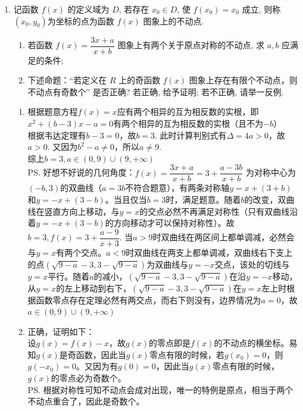 \begin{enumerate}
\begin{vspace_}
   \vsp[5] 
\end{vspace_}


\item 记函数 $f(x)$ 的定义域为 $D$, 若存在 $x_0 \in D$, 使 $f\left(x_0\right)=x_0$ 成立, 则称 $\left(x_0, y_0\right)$为坐标的点为函数 $f(x)$ 图象上的不动点.
\begin{enumerate}
    \item 若函数 $f(x)=\dfrac{3x+a}{x+b}$ 图象上有两个关于原点对称的不动点, 求 $a, b$ 应满足的条件;
    \item 下述命题：“若定义在 $R$ 上的奇函数 $f(x)$ 图象上存在有限个不动点，则不动点有奇数个” 是否正确? 若正确, 给予证明; 若不正确, 请举一反例.
\end{enumerate}
\begin{jieda}
    \begin{enumerate}
        \item 
        根据题意方程$f(x) = x$应有两个相异的互为相反数的实根，即$x^2 + (b-3)x - a = 0$有两个相异的互为相反数的实根（且不为$-b$）\\
        根据韦达定理有$b-3 = 0$，故$b = 3$. 此时计算判别式有$\Delta = 4a > 0$，故$a > 0$. 又因为$b^2 - a \neq 0$，所以$a \neq 9$.\\
        综上$b = 3, a \in (0, 9) \cup (9, +\infty)$
        \\
        \ps 好想不好说的几何角度：$f(x)=\dfrac{3x+a}{x+b} = 3 + \dfrac{a - 3b}{x+b}$ 为对称中心为$(-b, 3)$的双曲线（$a = 3b$不符合题意），有两条对称轴$y = x + (3+b)$和$y = -x + (3-b)$。当且仅当$b = 3$时，满足题意。随着$b$的改变，双曲线在竖直方向上移动，与$y = x$的交点必然不再满足对称性（只有双曲线沿着$y = -x + (3-b)$的方向移动才可以保持对称性）。故$b = 3, f(x) = 3 + \dfrac{a-9}{x+3}$. 当$a > 9$时双曲线在两区间上都单调减，必然会与$y = x$有两个交点。$a < 9$时双曲线在两支上都单调减，双曲线右下支上的点$(\sqrt{9-a}-3, 3-\sqrt{9-a})$为双曲线与$y = -x$交点，该处的切线与$y = x$平行。随着$a$的减小，$(\sqrt{9-a}-3, 3-\sqrt{9-a})$在沿$y = -x$移动，从$y = x$的左上移动到右下，$(\sqrt{9-a}-3, 3-\sqrt{9-a})$在$y = x$左上时根据函数零点存在定理必然有两交点，而右下则没有，边界情况为$a = 0$，故$a \in (0, 9) \cup (9, +\infty)$
        \item 正确，证明如下：\\
        设$g(x) = f(x) - x$，故$g(x)$的零点即是$f(x)$的不动点的横坐标。易知$g(x)$是奇函数，因此当$g(x)$零点有限的时候，若$g(x_0) = 0$，则$g(-x_0) = 0$。又因为有$g(0) = 0$，因此当$g(x)$零点有限的时候，$g(x)$的零点必为奇数个。 \\
        \ps 根据对称性可知不动点会成对出现，唯一的特例是原点，相当于两个不动点重合了，因此是奇数个。
    \end{enumerate}
\end{jieda}

\begin{vspace_}
   \vsp[5] 
\end{vspace_}
\end{enumerate}

